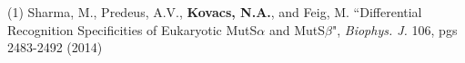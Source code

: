 \begin{cvpublications}

\cvpublication
{(1) Sharma, M., Predeus, A.V., {\bf Kovacs, N.A.}, and Feig, M. ``Differential Recognition Specificities of Eukaryotic MutS$\alpha$ and MutS$\beta$", \textit{Biophys. J.} 106, pgs 2483-2492 (2014)}
\vspace{-7.5mm}

\end{cvpublications}
